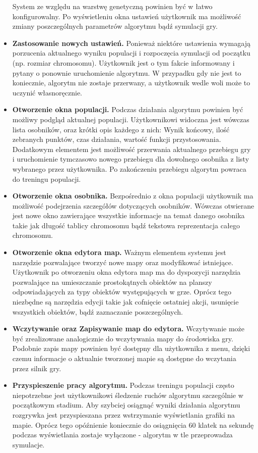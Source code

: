 \begin{itemize}
		\newline
		System ze względu na warstwę genetyczną powinien być w łatwo konfigurowalny. Po wyświetleniu okna ustawień użytkownik ma możliwość zmiany
		poszczególnych parametrów algorytmu bądź symulacji gry.
		\item {\bf Zastosowanie nowych ustawień. }
		\newline
		Ponieważ niektóre ustawienia wymagają porzucenia aktualnego wyniku populacji i rozpoczęcia symulacji od początku (np. rozmiar chromosomu).
		Użytkownik jest o tym fakcie informowany i pytany o ponownie uruchomienie algorytmu. 
		W przypadku gdy nie jest to koniecznie, algorytm nie zostaje przerwany, a użytkownik wedle woli może to uczynić własnoręcznie.
		\item {\bf Otworzenie okna populacji. }
		\newline
		Podczas działania algorytmu powinien być możliwy podgląd aktualnej populacji. Użytkownikowi widoczna jest wówczas lista osobników, oraz krótki opis każdego z nich:
		Wynik końcowy, ilość zebranych punktów, czas działania, wartość funkcji przystosowania. Dodatkowym elementem jest możliwość przerwania aktualnego przebiegu gry i uruchomienie tymczasowo nowego przebiegu dla dowolnego osobnika z listy wybranego przez użytkownika. Po zakończeniu przebiegu algorytm powraca do treningu populacji.
		\item {\bf Otworzenie okna osobnika. }
		\newline
		Bezpośrednio z okna populacji użytkownik ma możliwość podejrzenia szczegółów dotyczących osobników. Wówczas otwierane jest nowe okno zawierające wszystkie informacje na temat danego osobnika takie jak długość tablicy chromosomu bądź tekstowa reprezentacja całego chromosomu.
		\item {\bf Otworzenie okna edytora map. }
		\newline
		Ważnym elementem systemu jest narzędzie pozwalające tworzyć nowe mapy oraz modyfikować istniejące.
		Użytkownik po otworzeniu okna edytora map ma do dyspozycji narzędzia pozwalające na umieszczanie prostokątnych obiektów na planszy odpowiadających za typy obiektów występujących w grze. Oprócz tego niezbędne są narzędzia edycji takie jak cofnięcie ostatniej akcji, usunięcie wszystkich obiektów, bądź zaznaczanie poszczególnych.
		\item {\bf Wczytywanie oraz Zapisywanie map do edytora. }
		\newline
		Wczytywanie może być zrealizowane analogicznie do wczytywania mapy do środowiska gry. Podobnie zapis mapy powinien być dostępny dla użytkownika z menu, dzięki czemu informacje o aktualnie tworzonej mapie są dostępne do wczytania przez silnik gry.
		\item {\bf Przyspieszenie pracy algorytmu.}
		\newline
		Podczas treningu populacji często niepotrzebne jest użytkownikowi śledzenie ruchów algorytmu szczególnie w początkowym stadium. Aby szybciej osiągnąć wyniki działania algorytmu rozgrywka jest przyspieszana przez wstrzymanie wyświetlania grafiki na mapie. Oprócz tego opóźnienie koniecznie do osiągnięcia 60 klatek na sekundę podczas wyświetlania zostaje wyłączone - algorytm w tle przeprowadza symulacje.
	\end{itemize}
